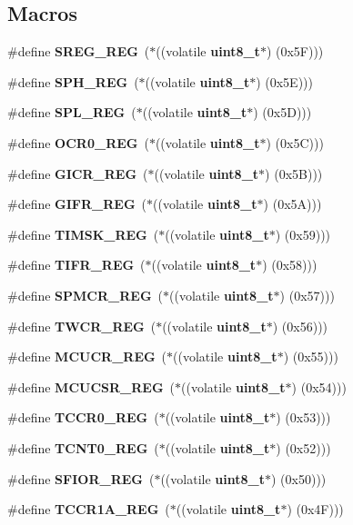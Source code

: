 \subsection*{Macros}
\begin{DoxyCompactItemize}
\item 
\#define \textbf{ S\+R\+E\+G\+\_\+\+R\+EG}~($\ast$((volatile \textbf{ uint8\+\_\+t}$\ast$) (0x5\+F)))
\item 
\#define \textbf{ S\+P\+H\+\_\+\+R\+EG}~($\ast$((volatile \textbf{ uint8\+\_\+t}$\ast$) (0x5\+E)))
\item 
\#define \textbf{ S\+P\+L\+\_\+\+R\+EG}~($\ast$((volatile \textbf{ uint8\+\_\+t}$\ast$) (0x5\+D)))
\item 
\#define \textbf{ O\+C\+R0\+\_\+\+R\+EG}~($\ast$((volatile \textbf{ uint8\+\_\+t}$\ast$) (0x5\+C)))
\item 
\#define \textbf{ G\+I\+C\+R\+\_\+\+R\+EG}~($\ast$((volatile \textbf{ uint8\+\_\+t}$\ast$) (0x5\+B)))
\item 
\#define \textbf{ G\+I\+F\+R\+\_\+\+R\+EG}~($\ast$((volatile \textbf{ uint8\+\_\+t}$\ast$) (0x5\+A)))
\item 
\#define \textbf{ T\+I\+M\+S\+K\+\_\+\+R\+EG}~($\ast$((volatile \textbf{ uint8\+\_\+t}$\ast$) (0x59)))
\item 
\#define \textbf{ T\+I\+F\+R\+\_\+\+R\+EG}~($\ast$((volatile \textbf{ uint8\+\_\+t}$\ast$) (0x58)))
\item 
\#define \textbf{ S\+P\+M\+C\+R\+\_\+\+R\+EG}~($\ast$((volatile \textbf{ uint8\+\_\+t}$\ast$) (0x57)))
\item 
\#define \textbf{ T\+W\+C\+R\+\_\+\+R\+EG}~($\ast$((volatile \textbf{ uint8\+\_\+t}$\ast$) (0x56)))
\item 
\#define \textbf{ M\+C\+U\+C\+R\+\_\+\+R\+EG}~($\ast$((volatile \textbf{ uint8\+\_\+t}$\ast$) (0x55)))
\item 
\#define \textbf{ M\+C\+U\+C\+S\+R\+\_\+\+R\+EG}~($\ast$((volatile \textbf{ uint8\+\_\+t}$\ast$) (0x54)))
\item 
\#define \textbf{ T\+C\+C\+R0\+\_\+\+R\+EG}~($\ast$((volatile \textbf{ uint8\+\_\+t}$\ast$) (0x53)))
\item 
\#define \textbf{ T\+C\+N\+T0\+\_\+\+R\+EG}~($\ast$((volatile \textbf{ uint8\+\_\+t}$\ast$) (0x52)))
\item 
\#define \textbf{ S\+F\+I\+O\+R\+\_\+\+R\+EG}~($\ast$((volatile \textbf{ uint8\+\_\+t}$\ast$) (0x50)))
\item 
\#define \textbf{ T\+C\+C\+R1\+A\+\_\+\+R\+EG}~($\ast$((volatile \textbf{ uint8\+\_\+t}$\ast$) (0x4\+F)))

\end{DoxyCompactItemize}
